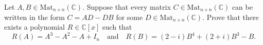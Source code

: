 \begin{problem}
    Let \( A, B \in \mathrm{Mat}_{n \times n}\left(\mathbb{C}\right) \). Suppose that every matrix \( C \in \mathrm{Mat}_{n \times n}\left(\mathbb{C}\right) \) can be written in the form \( C = AD - DB \) for some \( D \in \mathrm{Mat}_{n \times n}\left(\mathbb{C}\right) \). Prove that there exists a polynomial \( R \in \mathbb{C}\left[x\right] \) such that
    \[
        R\left(A\right) = A^3 - A^2 - A + I_n \quad \text{and} \quad R\left(B\right) = \left(2 - i\right)B^4 + \left(2 + i\right)B^3 - B.
    \]
\end{problem}

